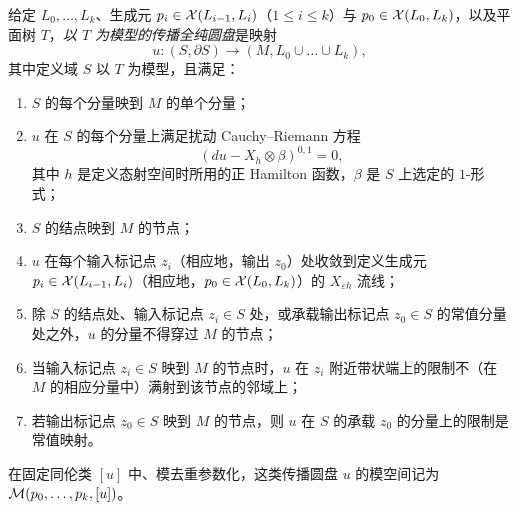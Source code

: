 \begin{defi}\label{def:proptree}
给定 $L_0,\dots,L_k$、生成元 $p_i\in \mathcal{X}(L_{i-1},L_i)$（$1\leq i\leq k$）与 $p_0\in \mathcal{X}(L_0,L_k)$，以及平面树 $T$，\emph{以 $T$ 为模型的传播全纯圆盘}是映射
\[
u:(S,\partial S)\to (M,L_0\cup\dots\cup L_k),
\]
其中定义域 $S$ 以 $T$ 为模型，且满足：
\begin{enumerate}
\item $S$ 的每个分量映到 $M$ 的单个分量；
\item $u$ 在 $S$ 的每个分量上满足扰动 Cauchy--Riemann 方程
\begin{equation}\label{eq:cauchyriemann}
(du-X_h\otimes \beta)^{0,1}=0,
\end{equation}
其中 $h$ 是定义态射空间时所用的正 Hamilton 函数，$\beta$ 是 $S$ 上选定的 $1$-形式；
\item $S$ 的结点映到 $M$ 的节点；
\item $u$ 在每个输入标记点 $z_i$（相应地，输出 $z_0$）处收敛到定义生成元 $p_i\in\mathcal{X}(L_{i-1},L_i)$（相应地，$p_0\in\mathcal{X}(L_0,L_k)$）的 $X_{\varepsilon h}$ 流线；
\item 除 $S$ 的结点处、输入标记点 $z_i\in S$ 处，或承载输出标记点 $z_0\in S$ 的常值分量处之外，$u$ 的分量不得穿过 $M$ 的节点；
\item 当输入标记点 $z_i\in S$ 映到 $M$ 的节点时，$u$ 在 $z_i$ 附近带状端上的限制不（在 $M$ 的相应分量中）满射到该节点的邻域上；
\item 若输出标记点 $z_0\in S$ 映到 $M$ 的节点，则 $u$ 在 $S$ 的承载 $z_0$ 的分量上的限制是常值映射。
\end{enumerate}
在固定同伦类 $[u]$ 中、模去重参数化，这类传播圆盘 $u$ 的模空间记为 $\mathcal{M}(p_0,\dots,p_k,[u])$。
\end{defi}

